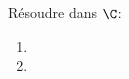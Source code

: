 \begin{exercice}
R\'esoudre dans $\C$:
  \begin{enumerate}
  \item {}

  \item {}

  
  \end{enumerate}
 
\end{exercice}
